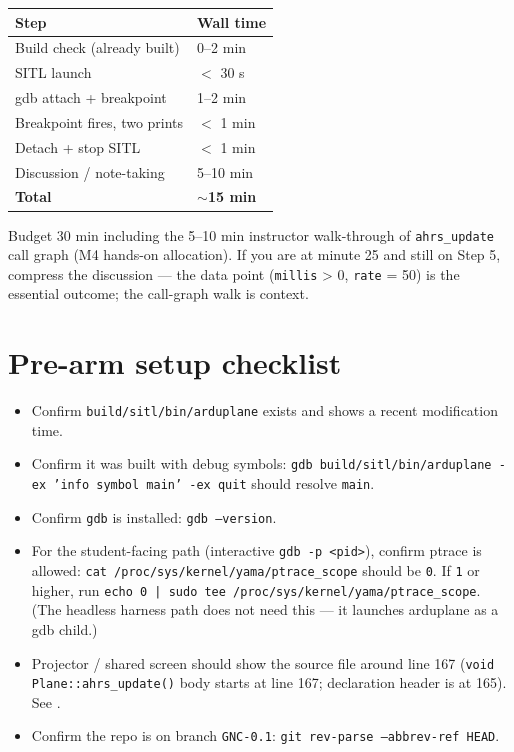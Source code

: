\documentclass[a4paper,11pt,twoside]{article}
\begin{document}
\begin{center}\small
\begin{tabular}{|p{6cm}|p{4cm}|}\hline
\textbf{Step} & \textbf{Wall time} \\ \hline
Build check (already built) & 0--2 min \\ \hline
SITL launch & $<$ 30 s \\ \hline
gdb attach + breakpoint & 1--2 min \\ \hline
Breakpoint fires, two prints & $<$ 1 min \\ \hline
Detach + stop SITL & $<$ 1 min \\ \hline
Discussion / note-taking & 5--10 min \\ \hline
\textbf{Total} & \textbf{$\sim$15 min} \\ \hline
\end{tabular}
\end{center}

Budget 30 min including the 5--10 min instructor walk-through of \texttt{ahrs\_update} call graph (M4 hands-on allocation). If you are at minute 25 and still on Step 5, compress the discussion --- the data point (\texttt{millis} > 0, \texttt{rate} = 50) is the essential outcome; the call-graph walk is context.

\section*{Pre-arm setup checklist}

\begin{itemize}[label={[ ]}]
  \item Confirm \texttt{build/sitl/bin/arduplane} exists and shows a recent modification time.
  \item Confirm it was built with debug symbols: \texttt{gdb build/sitl/bin/arduplane -ex 'info symbol main' -ex quit} should resolve \texttt{main}.
  \item Confirm \texttt{gdb} is installed: \texttt{gdb --version}.
  \item For the student-facing path (interactive \texttt{gdb -p <pid>}), confirm ptrace is allowed: \texttt{cat /proc/sys/kernel/yama/ptrace\_scope} should be \texttt{0}. If \texttt{1} or higher, run \texttt{echo 0 | sudo tee /proc/sys/kernel/yama/ptrace\_scope}. (The headless harness path does not need this --- it launches arduplane as a gdb child.)
  \item Projector / shared screen should show the source file  around line 167 (\texttt{void Plane::ahrs\_update()} body starts at line 167; declaration header is at 165). See .
  \item Confirm the repo is on branch \texttt{GNC-0.1}: \texttt{git rev-parse --abbrev-ref HEAD}.
\end{itemize}
\end{document}
